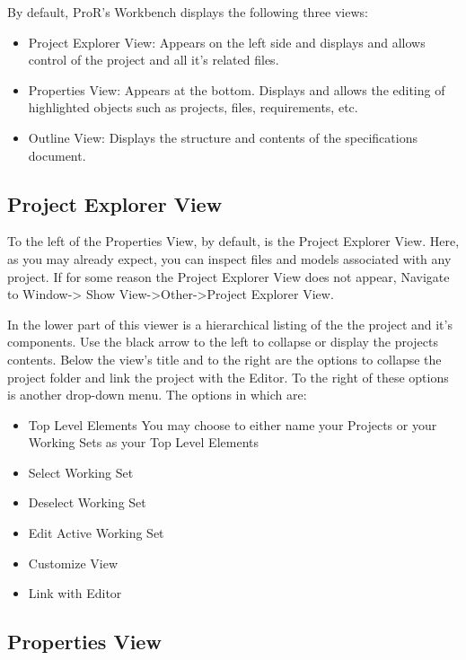 {{{By default, ProR's Workbench displays the following three views:
\begin{itemize}
\item Project Explorer View: Appears on the left side and displays and allows control of the project and all it's related files.
\item Properties View: Appears at the bottom. Displays and allows the editing of highlighted objects such as projects, files, requirements, etc.
\item Outline View: Displays the structure and contents of the specifications document.
\end{itemize}

\subsection{Project Explorer View}

To the left of the Properties View, by default, is the Project Explorer View. Here, as you may already expect, you can inspect files and models associated with any project. If for some reason the Project Explorer View does not appear, Navigate to Window-> Show View->Other->Project Explorer View.

In the lower part of this viewer is a hierarchical listing of the the project and it's components. Use the black arrow to the left to collapse or display the projects contents. Below the view's title and to the right are the options to collapse the project folder and link the project with the Editor. To the right of these options is another drop-down menu. The options in which are:
\begin{itemize}
\item Top Level Elements You may choose to either name your Projects or your Working Sets as your Top Level Elements
\item Select Working Set
\item Deselect Working Set
\item Edit Active Working Set
\item Customize View
\item Link with Editor
\end{itemize}

\subsection{Properties View}

}}}
